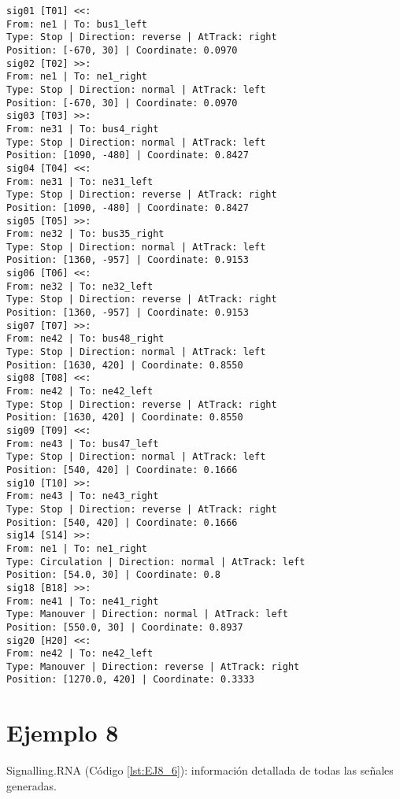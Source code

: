 	\begin{lstlisting}[language = {}, caption = Signalling.RNA, label = {lst:EJ7_6}]
sig01 [T01] <<:
From: ne1 | To: bus1_left
Type: Stop | Direction: reverse | AtTrack: right 
Position: [-670, 30] | Coordinate: 0.0970
sig02 [T02] >>:
From: ne1 | To: ne1_right
Type: Stop | Direction: normal | AtTrack: left 
Position: [-670, 30] | Coordinate: 0.0970
sig03 [T03] >>:
From: ne31 | To: bus4_right
Type: Stop | Direction: normal | AtTrack: left 
Position: [1090, -480] | Coordinate: 0.8427
sig04 [T04] <<:
From: ne31 | To: ne31_left
Type: Stop | Direction: reverse | AtTrack: right 
Position: [1090, -480] | Coordinate: 0.8427
sig05 [T05] >>:
From: ne32 | To: bus35_right
Type: Stop | Direction: normal | AtTrack: left 
Position: [1360, -957] | Coordinate: 0.9153
sig06 [T06] <<:
From: ne32 | To: ne32_left
Type: Stop | Direction: reverse | AtTrack: right 
Position: [1360, -957] | Coordinate: 0.9153
sig07 [T07] >>:
From: ne42 | To: bus48_right
Type: Stop | Direction: normal | AtTrack: left 
Position: [1630, 420] | Coordinate: 0.8550
sig08 [T08] <<:
From: ne42 | To: ne42_left
Type: Stop | Direction: reverse | AtTrack: right 
Position: [1630, 420] | Coordinate: 0.8550
sig09 [T09] <<:
From: ne43 | To: bus47_left
Type: Stop | Direction: normal | AtTrack: left 
Position: [540, 420] | Coordinate: 0.1666
sig10 [T10] >>:
From: ne43 | To: ne43_right
Type: Stop | Direction: reverse | AtTrack: right 
Position: [540, 420] | Coordinate: 0.1666
sig14 [S14] >>:
From: ne1 | To: ne1_right
Type: Circulation | Direction: normal | AtTrack: left 
Position: [54.0, 30] | Coordinate: 0.8
sig18 [B18] >>:
From: ne41 | To: ne41_right
Type: Manouver | Direction: normal | AtTrack: left 
Position: [550.0, 30] | Coordinate: 0.8937
sig20 [H20] <<:
From: ne42 | To: ne42_left
Type: Manouver | Direction: reverse | AtTrack: right 
Position: [1270.0, 420] | Coordinate: 0.3333
	\end{lstlisting}	
	\section{Ejemplo 8}
	Signalling.RNA (Código \ref{lst:EJ8_6}): información detallada de todas las señales generadas.
	
